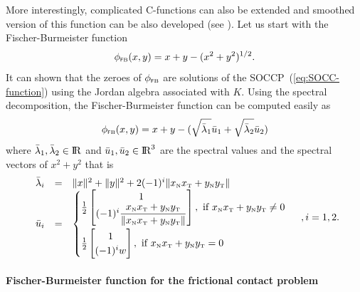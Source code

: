 More interestingly,  complicated C-functions can also be extended and smoothed version of this function can be also developed (see \cite{Fukushima.ea2001}
). Let us start with the Fischer-Burmeister function
\begin{equation}
  \label{eq:Jordan-FB}
  \phi_{\fb}(x,y) = x+y - (x^2 + y^2 )^{1/2}.
\end{equation}
It can shown that the zeroes of $\phi_{{\hbox{\tiny{\textsf FB}}}}$ are solutions of the SOCCP~(\ref{eq:SOCC-function}) using the Jordan algebra associated with $K$. Using the spectral decomposition, the Fischer-Burmeister function can be computed easily as
\begin{equation}
  \label{eq:Jordan-FB-1}
  \phi_{\fb}(x,y) = x+y - (\sqrt{\bar \lambda_1} \bar u_1 + \sqrt{\bar \lambda_2} \bar u_2)
\end{equation}
where $\bar\lambda_1,\bar\lambda_2\in \mathrm{I\!R}$ and $\bar u_1,\bar u_2\in\mathrm{I\!R}^3$ are the spectral values and the spectral vectors of $x^2+y^2$ that is
\begin{equation}
  \label{eq:Jordan-FB-2}
  \begin{array}{rcl}
    \bar \lambda_i&=& \|x\|^2  + \|y\|^2 +   2 (-1)^i\|x_{\n}x_{\t} +y_{\n}y_{\t}\| \\
    \bar u_i &=&
    \begin{cases}
      \frac{1}{2}
      \begin{bmatrix}
        1 \\
        (-1)^i \Frac{x_{\n}x_{\t} +y_{\n}y_{\t}}{\|x_{\n}x_{\t} +y_{\n}y_{\t}\|}
      \end{bmatrix}, \text{ if } x_{\n}x_{\t} +y_{\n}y_{\t}\neq 0 \\[5mm]
       \frac{1}{2}
      \begin{bmatrix}
        1 \\
        (-1)^i w
      \end{bmatrix}, \text{ if } x_{\n}x_{\t} +y_{\n}y_{\t} = 0 \\
    \end{cases}
\end{array}, i = 1,2.
\end{equation}




\paragraph{Fischer-Burmeister function for the frictional contact problem}



